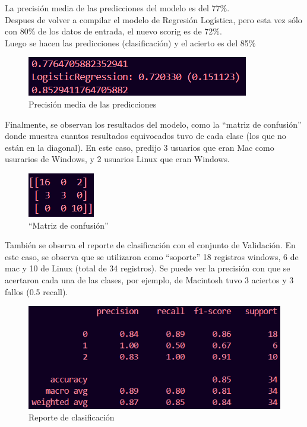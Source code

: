 \documentclass{article}
\begin{document}
\newpage
La precisión media de las predicciones del modelo es del 77\%.\\
Despues de volver a compilar el modelo de Regresión Logística, pero esta vez sólo con 80\% de los datos de entrada, el nuevo scorig es de 72\%. \\
Luego se hacen las predicciones (clasificación) y el acierto es del 85\%
\begin{figure}[H]
    \centering
    \includegraphics[width=0.5\linewidth]{img/a11_resultados.png}
    \caption{Precisión media de las predicciones}
    \label{fig:figure2}
\end{figure}

Finalmente, se observan los resultados del modelo, como la “matriz de confusión” donde muestra cuantos resultados equivocados tuvo de cada clase (los que no están en la diagonal). En este caso, predijo 3 usuarios que eran Mac como usurarios de Windows, y 2 usuarios Linux que eran Windows.
\begin{figure}[H]
    \centering
    \includegraphics[width=0.2\linewidth]{img/a11_matriz.png}
    \caption{“Matriz de confusión”}
    \label{fig:figure2}
\end{figure}

También se observa el reporte de clasificación con el conjunto de Validación. En este caso, se observa que se utilizaron como “soporte” 18 registros windows, 6 de mac y 10 de Linux (total de 34 registros). Se puede ver la precisión con que se acertaron cada una de las clases, por ejemplo,  de Macintosh tuvo 3 aciertos y 3 fallos (0.5 recall).
\begin{figure}[H]
    \centering
    \includegraphics[width=0.8\linewidth]{img/a11_clasificacion.png}
    \caption{Reporte de clasificación}
    \label{fig:figure2}
\end{figure}
\newpage
\end{document}
